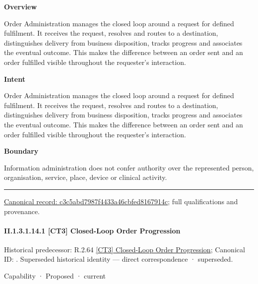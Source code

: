 \textbf{Overview}



Order Administration manages the closed loop around a request for defined fulfilment. It receives the request, resolves and routes to a destination, distinguishes delivery from business disposition, tracks progress and associates the eventual outcome. This makes the difference between an order sent and an order fulfilled visible throughout the requester's interaction.



\textbf{Intent}



Order Administration manages the closed loop around a request for defined fulfilment. It receives the request, resolves and routes to a destination, distinguishes delivery from business disposition, tracks progress and associates the eventual outcome. This makes the difference between an order sent and an order fulfilled visible throughout the requester's interaction.



\textbf{Boundary}



Information administration does not confer authority over the represented person, organisation, service, place, device or clinical activity.



\medskip\hrule\medskip

{\footnotesize \href{../../../../../../../continuum/strategy/capability/c3c5abd7987f4433a46cbfed8167914c.md}{Canonical record: c3c5abd7987f4433a46cbfed8167914c}; full qualifications and provenance.}\par
\paragraph*{II.1.3.1.14.1 [CT3] Closed-Loop Order Progression}
\label{navigation:II.1.3.1.14.1}

{\small Historical predecessor: R.2.64 \hyperref[element:2ad29cebc1e94053a300d869e7797232]{[CT3] Closed-Loop Order Progression}; Canonical ID: \texttt{}. Superseded historical identity — direct correspondence · superseded.}\par
\label{element:2f79ebd7392c46ef92def6f25bc9c7ce}
{\small Capability · Proposed · current}\par

